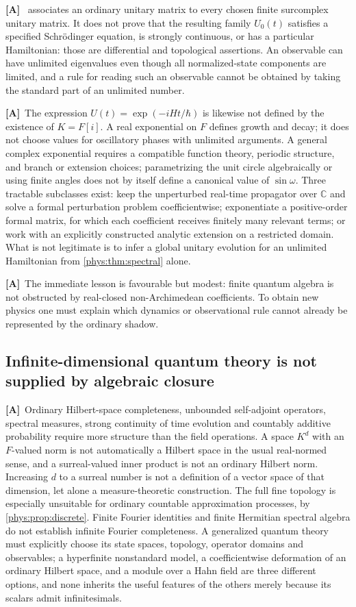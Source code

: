 \documentclass[11pt,letterpaper]{article}
\numberwithin{equation}{section}
\theoremstyle{definition}
\theoremstyle{remark}
\newcommand{\C}{\mathbb C}
\newcommand{\TA}{\textcolor{TierA}{\textsf{\bfseries[A]}}}
\begin{document}
\TA\  associates an ordinary unitary matrix to
every chosen finite surcomplex unitary matrix. It does not prove that the
resulting family $U_{0}(t)$ satisfies a specified Schr\"odinger equation, is
strongly continuous, or has a particular Hamiltonian: those are differential
and topological assertions. An observable can have unlimited eigenvalues even
though all normalized-state components are limited, and a rule for reading such
an observable cannot be obtained by taking the standard part of an unlimited
number.

\TA\ The expression $U(t)=\exp(-iHt/\hbar)$ is likewise not defined by the
existence of $K=F[i]$. A real exponential on $F$ defines growth and decay; it
does not choose values for oscillatory phases with unlimited arguments. A
general complex exponential requires a compatible function theory, periodic
structure, and branch or extension choices; parametrizing the unit circle
algebraically or using finite angles does not by itself define a canonical
value of $\sin\omega$. Three tractable subclasses exist: keep the unperturbed
real-time propagator over $\C$ and solve a formal perturbation problem
coefficientwise; exponentiate a positive-order formal matrix, for which each
coefficient receives finitely many relevant terms; or work with an explicitly
constructed analytic extension on a restricted domain. What is not legitimate
is to infer a global unitary evolution for an unlimited Hamiltonian from
\cref{phys:thm:spectral} alone.

\TA\ The immediate lesson is favourable but modest: finite quantum algebra is
not obstructed by real-closed non-Archimedean coefficients. To obtain new
physics one must explain which dynamics or observational rule cannot already be
represented by the ordinary shadow.

\subsection{Infinite-dimensional quantum theory is not supplied by algebraic
closure}
\label{phys:sub:infdim}

\TA\ Ordinary Hilbert-space completeness, unbounded self-adjoint operators,
spectral measures, strong continuity of time evolution and countably additive
probability require more structure than the field operations. A space $K^{d}$
with an $F$-valued norm is not automatically a Hilbert space in the usual
real-normed sense, and a surreal-valued inner product is not an ordinary
Hilbert norm. Increasing $d$ to a surreal number is not a definition of a
vector space of that dimension, let alone a measure-theoretic construction. The
full fine topology is especially unsuitable for ordinary countable
approximation processes, by \cref{phys:prop:discrete}. Finite Fourier
identities and finite Hermitian spectral algebra do not establish infinite
Fourier completeness. A generalized quantum theory must explicitly choose its
state spaces, topology, operator domains and observables; a hyperfinite
nonstandard model, a coefficientwise deformation of an ordinary Hilbert space,
and a module over a Hahn field are three different options, and none inherits
the useful features of the others merely because its scalars admit
infinitesimals.
\end{document}
